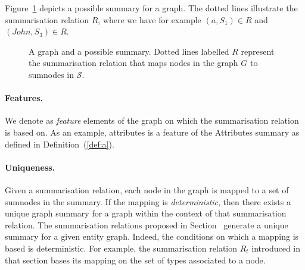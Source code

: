 Figure~\ref{fig:basic-summary} depicts a possible summary for a graph. The dotted lines illustrate the summarisation relation $R$, where we have for example $(a, S_1) \in R$ and $(John, S_3) \in R$.

\begin{figure}
	\centering
	\resizebox{.7\textwidth}{!}{
		
	}
	\caption{A graph and a possible summary. Dotted lines labelled $R$ represent the summarisation relation that maps nodes in the graph $G$ to sumnodes in $\mathcal{S}$.}
	\label{fig:basic-summary}
\end{figure}

\paragraph{Features.}

We denote as \emph{feature} elements of the graph on which the summarisation relation is based on. As an example, attributes is a feature of the Attributes summary as defined in Definition~(\ref{def:a}).

\paragraph{Uniqueness.}

Given a summarisation relation, each node in the graph is mapped to a set of sumnodes in the summary. If the mapping is \emph{deterministic}, then there exists a unique graph summary for a graph within the context of that summarisation relation. The summarisation relations proposed in Section~\label{sec:approximate} generate a unique summary for a given entity graph. Indeed, the conditions on which a mapping is based is deterministic. For example, the summarisation relation $R_t$ introduced in that section bases its mapping on the set of types associated to a node.

